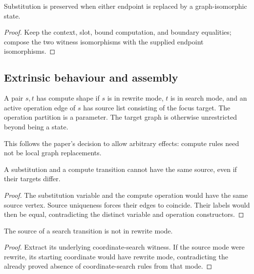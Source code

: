 \begin{lemma}
Substitution is preserved when either endpoint is replaced by a graph-isomorphic
state.
\end{lemma}
\begin{proof}
Keep the context, slot, bound computation, and boundary equalities; compose
the two witness isomorphisms with the supplied endpoint isomorphisms.
\end{proof}

\subsection{Extrinsic behaviour and assembly}
\begin{definition}
A pair $s,t$ has compute shape if $s$ is in rewrite mode, $t$ is in search
mode, and an active operation edge of $s$ has source list consisting of the
focus target. The operation partition is a parameter. The target graph is
otherwise unrestricted beyond being a state.
\end{definition}
This follows the paper's decision to allow arbitrary effects: compute rules
need not be local graph replacements.
\begin{lemma}
A substitution and a compute transition cannot have the same source, even if
their targets differ.
\end{lemma}
\begin{proof}
The substitution variable and the compute operation would have the same source
vertex. Source uniqueness forces their edges to coincide. Their labels would
then be equal, contradicting the distinct variable and operation constructors.
\end{proof}
\begin{lemma}
The source of a search transition is not in rewrite mode.
\end{lemma}
\begin{proof}
Extract its underlying coordinate-search witness. If the source mode were
rewrite, its starting coordinate would have rewrite mode, contradicting the
already proved absence of coordinate-search rules from that mode.
\end{proof}

